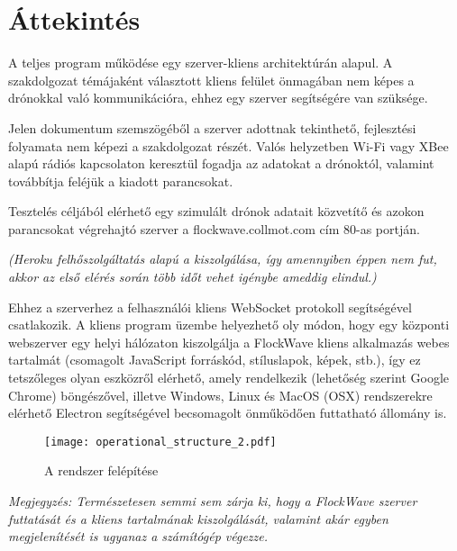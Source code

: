 \section{Áttekintés}

A teljes program működése egy szerver-kliens architektúrán alapul. A
szakdolgozat témájaként választott kliens felület önmagában nem képes a
drónokkal való kommunikációra, ehhez egy szerver segítségére van szüksége.

Jelen dokumentum szemszögéből a szerver adottnak tekinthető, fejlesztési
folyamata nem képezi a szakdolgozat részét. Valós helyzetben Wi-Fi vagy XBee
alapú rádiós kapcsolaton keresztül fogadja az adatokat a drónoktól, valamint
továbbítja feléjük a kiadott parancsokat.

Tesztelés céljából elérhető egy szimulált drónok adatait közvetítő és azokon
parancsokat végrehajtó szerver a flockwave.collmot.com cím 80-as portján.

\textit{
  (Heroku felhőszolgáltatás alapú a kiszolgálása, így amennyiben éppen nem fut,
  akkor az első elérés során több időt vehet igénybe ameddig elindul.)
}

Ehhez a szerverhez a felhasználói kliens WebSocket protokoll segítségével
csatlakozik. A kliens program üzembe helyezhető oly módon, hogy egy központi
webszerver egy helyi hálózaton kiszolgálja a FlockWave kliens alkalmazás webes
tartalmát (csomagolt JavaScript forráskód, stíluslapok, képek, stb.), így ez
tetszőleges olyan eszközről elérhető, amely rendelkezik (lehetőség szerint
Google Chrome) böngészővel, illetve Windows, Linux és MacOS (OSX) rendszerekre
elérhető Electron segítségével becsomagolt önműködően futtatható állomány is.

\begin{figure}[H]
  \texttt{[image: operational\_structure\_2.pdf]}
  \caption{A rendszer felépítése}
  \label{fig:operational_structure_2}
\end{figure}

\textit{
  Megjegyzés: Természetesen semmi sem zárja ki, hogy a FlockWave szerver
  futtatását és a kliens tartalmának kiszolgálását, valamint akár egyben
  megjelenítését is ugyanaz a számítógép végezze.
}
